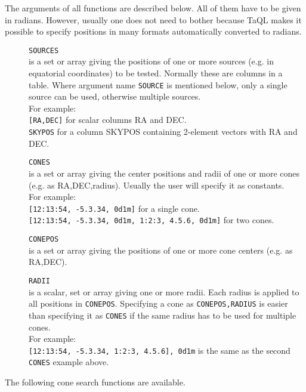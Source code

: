 The arguments of all functions are described below. All of them have
to be given in radians. However, usually one does not need to bother
because TaQL makes it possible
to specify positions in many formats automatically converted
to radians.
\begin{description}
  \item[] \texttt{SOURCES}\\
       is a set or array giving the positions of one or more
       sources (e.g. in equatorial coordinates)
       to be tested. Normally these are columns in a table.
       Where argument name \texttt{SOURCE} is mentioned below, only a
       single source can be used, otherwise multiple sources.
       \\For example:
       \\\texttt{[RA,DEC]} for scalar columns RA and DEC.
       \\\texttt{SKYPOS} for a column SKYPOS containing 2-element
       vectors with RA and DEC.
  \item[] \texttt{CONES}\\
       is a set or array giving the center positions and radii of
       one or more cones (e.g. as RA,DEC,radius).
       Usually the user will specify it as constants.
       \\For example:
       \\\texttt{[12:13:54, -5.3.34, 0d1m]} for a single cone.
       \\\texttt{[12:13:54, -5.3.34, 0d1m, 1:2:3, 4.5.6, 0d1m]} for two cones.
  \item[] \texttt{CONEPOS}\\
       is a set or array giving the positions of one or more
       cone centers (e.g. as RA,DEC).
  \item[] \texttt{RADII}\\
       is a scalar, set or array giving one or more radii.
       Each radius is applied to all positions in \texttt{CONEPOS}.
       Specifying a cone as \texttt{CONEPOS,RADIUS} is easier than specifying
       it as \texttt{CONES} if the same radius has to be used for
       multiple cones.
       \\For example:
       \\\texttt{[12:13:54, -5.3.34, 1:2:3, 4.5.6], 0d1m} is the same
       as the second \texttt{CONES} example above.
\end{description}
The following cone search functions are available.
